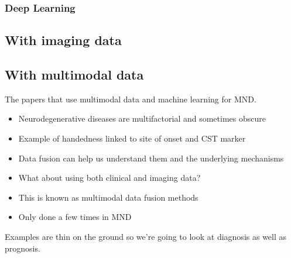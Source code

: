 \subsubsection{Deep Learning}

\subsection{With imaging data}


\subsection{With multimodal data}

The papers that use multimodal data and machine learning for MND.
\begin{itemize}
    \item Neurodegenerative diseases are multifactorial and sometimes obscure
    \item Example of handedness linked to site of onset and CST marker
    \item Data fusion can help us understand them and the underlying mechanisms
    \item What about using both clinical and imaging data?
    \item This is known as multimodal data fusion methods
    \item Only done a few times in MND
\end{itemize}

Examples are thin on the ground so we're going to look at diagnosis as well as prognosis.



